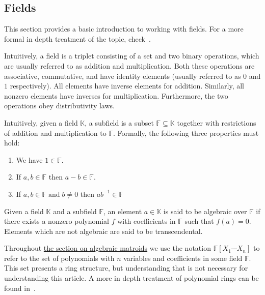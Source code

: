 \subsection{Fields}\label{sec:appendix-fields}

This section provides a basic introduction to working with fields. For a more formal in depth treatment of the topic, check~\cite{milne2022}.

\begin{defn}[Fields]
  Intuitively, a field is a triplet consisting of a set and two binary operations, which are usually referred to as addition and multiplication. Both these operations are associative, commutative, and have identity elements (usually referred to as $0$ and $1$ respectively). All elements have inverse elements for addition. Similarly, all nonzero elements have inverses for multiplication. Furthermore, the two operations obey distributivity laws.
\end{defn}

\begin{defn}[Subfields]
  Intuitively, given a field $\mathbb{K}$, a subfield is a subset $\mathbb{F} \subseteq \mathbb{K}$ together with restrictions of addition and multiplication to $\mathbb{F}$. Formally, the following three properties must hold:
  \begin{enumerate}
    \item We have $1 \in \mathbb{F}$.
    \item If $a, b \in \mathbb{F} $ then $ a - b \in \mathbb{F}$.
    \item If $a, b \in \mathbb{F} \;\text{and}\; b \neq 0$ then $ a b ^{-1}  \in \mathbb{F}$
  \end{enumerate}
\end{defn}

\begin{defn}
  Given a field $\mathbb{K}$ and a subfield $\mathbb{F}$, an element $a \in \mathbb{K}$ is said to be algebraic over $\mathbb{F}$ if there exists a nonzero polynomial $f$ with coefficients in $\mathbb{F}$ such that $f(a) = 0$. Elements which are not algebraic are said to be transcendental.
\end{defn}


Throughout \hyperref[sec:algebraic-matroids]{the section on algebraic matroids} we use the notation $\mathbb{F}[X _1 \cdots X_n]$ to refer to the set of polynomials with $n$ variables and coefficients in some field $\mathbb{F}$. This set presents a ring structure, but understanding that is not necessary for understanding this article. A more in depth treatment of polynomial rings can be found in~\cite{milne2022}.


